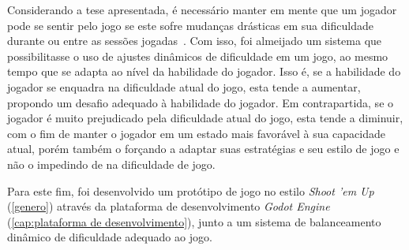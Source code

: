 Considerando a tese apresentada, é necessário manter em mente que um jogador pode se sentir \textquotedbl{} pelo jogo se este sofre mudanças drásticas em sua dificuldade durante ou entre as sessões jogadas~\citep{DynamicDiffAdjustment}. Com isso, foi almeijado um sistema que possibilitasse o uso de ajustes dinâmicos de dificuldade em um jogo, ao mesmo tempo que se adapta ao nível da habilidade do jogador. Isso é, se a habilidade do jogador se enquadra na dificuldade atual do jogo, esta tende a aumentar, propondo um desafio adequado à habilidade do jogador. Em contrapartida, se o jogador é muito prejudicado pela dificuldade atual do jogo, esta tende a diminuir, com o fim de manter o jogador em um estado mais favorável à sua capacidade atual, porém também o forçando a adaptar suas estratégias e seu estilo de jogo e não o impedindo de \textquotedbl{} na dificuldade de jogo.

Para este fim, foi desenvolvido um protótipo de jogo no estilo \textit{Shoot 'em Up} (\ref{genero}) através da plataforma de desenvolvimento \textit{Godot Engine} (\ref{cap:plataforma de desenvolvimento}), junto a um sistema de balanceamento dinâmico de dificuldade adequado ao jogo.

